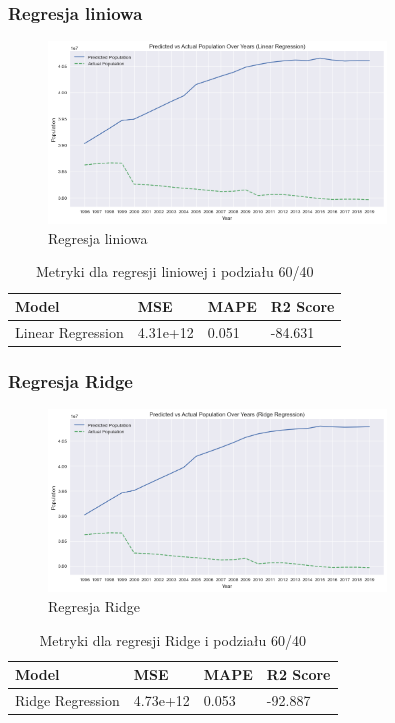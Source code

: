 \documentclass[11pt]{article}
\begin{document}
\subsubsection*{Regresja liniowa}
\begin{figure}[H]
        \centering
        \includegraphics[width=0.8\textwidth]{images/linear996.png}
        \caption{Regresja liniowa}
\end{figure}
\begin{table}[H]
        \centering
        \begin{tabular}{|l|l|l|l|}
        \hline
        Model & MSE & MAPE & R2 Score \\ \hline
        Linear Regression & 4.31e+12 & 0.051 & -84.631 \\ \hline
        \end{tabular}
        \caption{Metryki dla regresji liniowej i podziału 60/40}
        \end{table}
\subsubsection*{Regresja Ridge}
\begin{figure}[H]
        \centering
        \includegraphics[width=0.8\textwidth]{images/ridge996.png}
        \caption{Regresja Ridge}
\end{figure}
\begin{table}[H]
        \centering
        \begin{tabular}{|l|l|l|l|}
        \hline
        Model & MSE & MAPE & R2 Score \\ \hline
        Ridge Regression & 4.73e+12 & 0.053 & -92.887 \\ \hline
        \end{tabular}
        \caption{Metryki dla regresji Ridge i podziału 60/40}
        \end{table}
\end{document}

